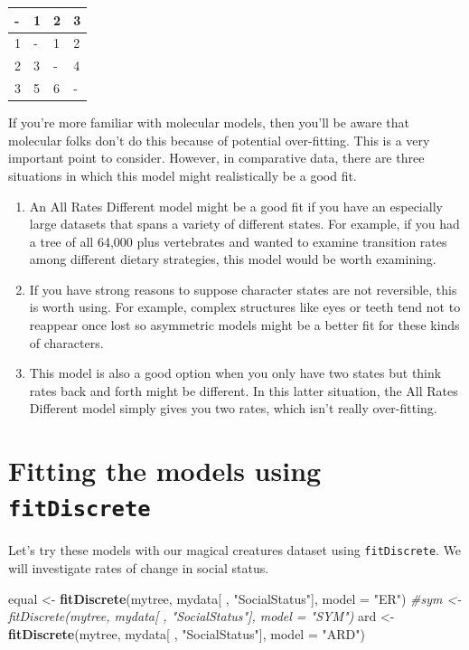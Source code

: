 \documentclass[]{book}
\newenvironment{Shaded}{\begin{snugshade}}{\end{snugshade}}
\newcommand{\KeywordTok}[1]{\textcolor[rgb]{0.13,0.29,0.53}{\textbf{{#1}}}}
\newcommand{\DataTypeTok}[1]{\textcolor[rgb]{0.13,0.29,0.53}{{#1}}}
\newcommand{\StringTok}[1]{\textcolor[rgb]{0.31,0.60,0.02}{{#1}}}
\newcommand{\CommentTok}[1]{\textcolor[rgb]{0.56,0.35,0.01}{\textit{{#1}}}}
\newcommand{\NormalTok}[1]{{#1}}
\providecommand{\tightlist}{%
  \setlength{\itemsep}{0pt}\setlength{\parskip}{0pt}}
\begin{document}
\begin{longtable}[]{@{}llll@{}}
\toprule
- & 1 & 2 & 3\tabularnewline
\midrule
\endhead
1 & - & 1 & 2\tabularnewline
2 & 3 & - & 4\tabularnewline
3 & 5 & 6 & -\tabularnewline
\bottomrule
\end{longtable}

If you're more familiar with molecular models, then you'll be aware that
molecular folks don't do this because of potential over-fitting. This is
a very important point to consider. However, in comparative data, there
are three situations in which this model might realistically be a good
fit.

\begin{enumerate}
\def\labelenumi{\arabic{enumi}.}
\tightlist
\item
  An All Rates Different model might be a good fit if you have an
  especially large datasets that spans a variety of different states.
  For example, if you had a tree of all 64,000 plus vertebrates and
  wanted to examine transition rates among different dietary strategies,
  this model would be worth examining.
\item
  If you have strong reasons to suppose character states are not
  reversible, this is worth using. For example, complex structures like
  eyes or teeth tend not to reappear once lost so asymmetric models
  might be a better fit for these kinds of characters.
\item
  This model is also a good option when you only have two states but
  think rates back and forth might be different. In this latter
  situation, the All Rates Different model simply gives you two rates,
  which isn't really over-fitting.
\end{enumerate}

\section{\texorpdfstring{Fitting the models using
\texttt{fitDiscrete}}{Fitting the models using fitDiscrete}}\label{fitting-the-models-using-fitdiscrete}

Let's try these models with our magical creatures dataset using
\texttt{fitDiscrete}. We will investigate rates of change in social
status.

\begin{Shaded}
\begin{Highlighting}[]
\NormalTok{equal <-}\StringTok{ }\KeywordTok{fitDiscrete}\NormalTok{(mytree, mydata[ , }\StringTok{"SocialStatus"}\NormalTok{], }\DataTypeTok{model =} \StringTok{"ER"}\NormalTok{)}
\CommentTok{#sym <- fitDiscrete(mytree, mydata[ , "SocialStatus"], model = "SYM")}
\NormalTok{ard <-}\StringTok{ }\KeywordTok{fitDiscrete}\NormalTok{(mytree, mydata[ , }\StringTok{"SocialStatus"}\NormalTok{], }\DataTypeTok{model =} \StringTok{"ARD"}\NormalTok{)}
\end{Highlighting}
\end{Shaded}
\end{document}
